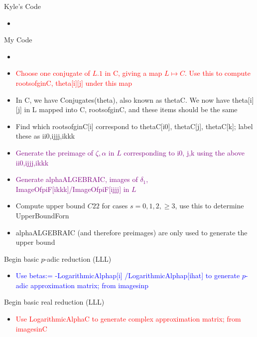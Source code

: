 \documentclass[11pt]{article}
\theoremstyle{definition}
\begin{document}
\newpage

\begin{multicols}{2}
Kyle's Code
\begin{itemize}
\item
\end{itemize}

\columnbreak

My Code
\begin{itemize}
\item
\end{itemize}
\end{multicols}





\newpage
\begin{itemize}
\item \textcolor{red}{Choose one conjugate of $L.1$ in C, giving a map $L \mapsto C$. Use this to compute rootsofginC, theta[i][j] under this map}
\end{itemize}
\begin{center}
\end{center}
\begin{itemize}
\item In C, we have Conjugates(theta), also known as thetaC. We now have theta[i][j] in L mapped into C, rootsofginC, and these items should be the same
\item Find which rootsofginC[i] correspond to thetaC[i0], thetaC[j], thetaC[k]; label these as ii0,ijjj,ikkk
\item \textcolor{purple}{Generate the preimage of $\zeta, \alpha$ in $L$ corresponding to i0, j,k using the above ii0,ijjj,ikkk}
\item \textcolor{purple}{Generate alphaALGEBRAIC, images of $\delta_1$, ImageOfpiF[ikkk]/ImageOfpiF[ijjj] in $L$}
\item Compute upper bound $C22$ for cases $s = 0,1,2, \geq 3$, use this to determine UpperBoundForn \\
\item alphaALGEBRAIC (and therefore preimages) are only used to generate the upper bound
\end{itemize}

Begin basic $p$-adic reduction (LLL)
\begin{itemize}
\item \textcolor{blue}{Use betas:= -LogarithmicAlphap[i] /LogarithmicAlphap[ihat] to generate $p$-adic approximation matrix; from imagesinp}
\end{itemize}

Begin basic real reduction (LLL)
\begin{itemize}
\item \textcolor{red}{Use LogarithmicAlphaC to generate complex approximation matrix; from imagesinC}
\end{itemize}
\end{document}

